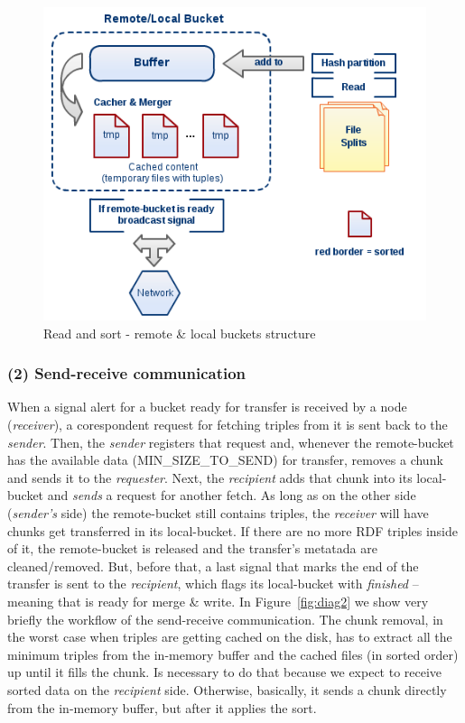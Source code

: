 \begin{figure}
\centering
\includegraphics[scale=0.6]{diag1}
\caption{Read and sort - remote \& local buckets structure}
\label{fig:diag1}
\end{figure}

% 
\subsubsection*{(2) Send-receive communication}

When a signal alert for a bucket ready for transfer is received by a node (\textit{receiver}), a corespondent request for fetching triples from it is sent back to the \textit{sender}. Then, the \textit{sender} registers that request and, whenever the remote-bucket has the available data (MIN\_SIZE\_TO\_SEND) for transfer, removes a chunk and sends it to the \textit{requester}. Next, the \textit{recipient} adds that chunk into its local-bucket and \textit{sends} a request for another fetch. As long as on the other side (\textit{sender's} side) the remote-bucket still contains triples, the \textit{receiver} will have chunks get transferred in its local-bucket. If there are no more RDF triples inside of it, the remote-bucket is released and the transfer's metatada are cleaned/removed. But, before that, a last signal that marks the end of the transfer is sent to the \textit{recipient}, which flags its local-bucket with \textit{finished} -- meaning that is ready for merge \& write. In Figure~\ref{fig:diag2} we show very briefly the workflow of the send-receive communication. The chunk removal, in the worst case when triples are getting cached on the disk, has to extract all the minimum triples from the in-memory buffer and the cached files (in sorted order) up until it fills the chunk. Is necessary to do that because we expect to receive sorted data on the \textit{recipient} side. Otherwise, basically, it sends a chunk directly from the in-memory buffer, but after it applies the sort.

